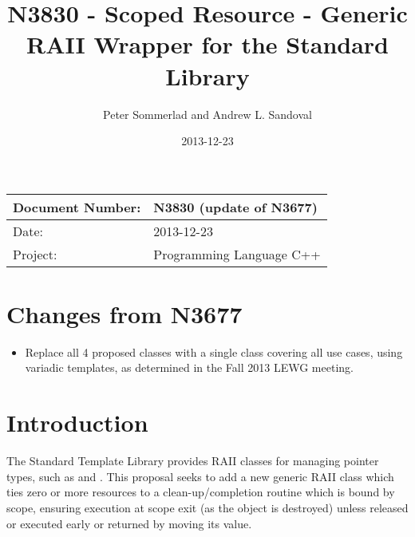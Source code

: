\documentclass[ebook,11pt,article]{memoir}
\title{N3830 - Scoped Resource - Generic RAII Wrapper for the Standard Library}
\author{Peter Sommerlad and Andrew L. Sandoval}
\date{2013-12-23}                                           %
\begin{document}
\maketitle
\begin{tabular}[t]{|l|l|}\hline 
Document Number: &  N3830 (update of N3677)\\\hline
Date: & 2013-12-23 \\\hline
Project: & Programming Language C++\\\hline 
\end{tabular}

\chapter{Changes from N3677}
\begin{itemize}
\item Replace all 4 proposed classes with a single class covering all use cases, using variadic templates, as determined in the Fall 2013 LEWG meeting.
\end{itemize}

\chapter{Introduction}
The Standard Template Library provides RAII classes for managing pointer types, such as  and .  This proposal seeks to add a new generic RAII class which ties zero or more resources to a clean-up/completion routine which is bound by scope, ensuring execution at scope exit (as the object is destroyed) unless released or executed early or returned by moving its value.
\end{document}
